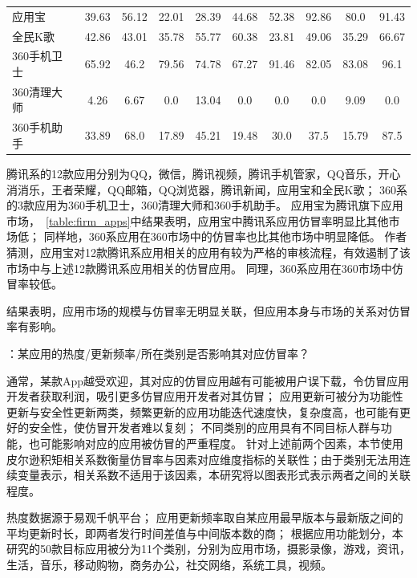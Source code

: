 \begin{table}[htbp]
\begin{tabular}{l c c c c c c c c c}
        应用宝                          & 39.63      & 56.12          & 22.01        & 28.39        & 44.68     & 52.38        & 92.86      & 80.0       & 91.43      \\
        \rowcolor{gray!15} 全民K歌      & 42.86      & 43.01          & 35.78        & 55.77        & 60.38     & 23.81        & 49.06      & 35.29      & 66.67      \\
        360手机卫士                     & 65.92      & 46.2           & 79.56        & 74.78        & 67.27     & 91.46        & 82.05      & 83.08      & 96.1       \\
        \rowcolor{gray!15} 360清理大师  & 4.26       & 6.67           & 0.0          & 13.04        & 0.0       & 0.0          & 0.0        & 9.09       & 0.0        \\
        360手机助手                     & 33.89      & 68.0           & 17.89        & 45.21        & 19.48     & 30.0         & 37.5       & 15.79      & 87.5       \\
        \bottomrule
    \end{tabular}
    \label{table:firm_apps}
\end{table}

腾讯系的12款应用分别为QQ，微信，腾讯视频，腾讯手机管家，QQ音乐，开心消消乐，王者荣耀，QQ邮箱，QQ浏览器，腾讯新闻，应用宝和全民K歌；
360系的3款应用为360手机卫士，360清理大师和360手机助手。
应用宝为腾讯旗下应用市场，~\autoref{table:firm_apps}中结果表明，应用宝中腾讯系应用仿冒率明显比其他市场低；
同样地，360系应用在360市场中的仿冒率也比其他市场中明显降低。
作者猜测，应用宝对12款腾讯系应用相关的应用有较为严格的审核流程，有效遏制了该市场中与上述12款腾讯系应用相关的仿冒应用。
同理，360系应用在360市场中仿冒率较低。

结果表明，应用市场的规模与仿冒率无明显关联，但应用本身与市场的关系对仿冒率有影响。

：某应用的热度/更新频率/所在类别是否影响其对应仿冒率？

通常，某款App越受欢迎，其对应的仿冒应用越有可能被用户误下载，令仿冒应用开发者获取利润，吸引更多仿冒应用开发者对其仿冒；
应用更新可被分为功能性更新与安全性更新两类，频繁更新的应用功能迭代速度快，复杂度高，也可能有更好的安全性，使仿冒开发者难以复刻；
不同类别的应用具有不同目标人群与功能，也可能影响对应的应用被仿冒的严重程度。
针对上述前两个因素，本节使用皮尔逊积矩相关系数衡量仿冒率与因素对应维度指标的关联性；由于类别无法用连续变量表示，相关系数不适用于该因素，本研究将以图表形式表示两者之间的关联程度。

热度数据源于易观千帆平台；
应用更新频率取自某应用最早版本与最新版之间的平均更新时长，即两者发行时间差值与中间版本数的商；
根据应用功能划分，本研究的50款目标应用被分为11个类别，分别为应用市场，摄影录像，游戏，资讯，生活，音乐，移动购物，商务办公，社交网络，系统工具，视频。

